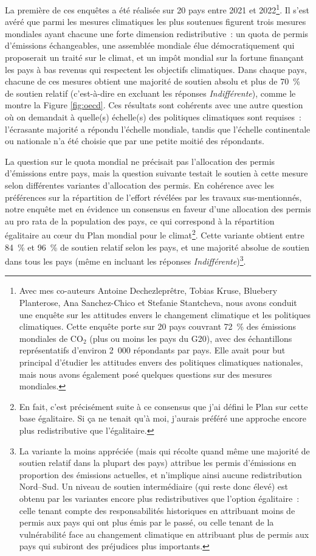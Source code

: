 \documentclass[a5paper,french]{memoir}
\begin{document}
La première de ces enquêtes a été réalisée sur 20 pays %
entre 2021 et 2022\footnote{Avec mes co-auteurs Antoine Dechezleprêtre, Tobias Kruse, Bluebery Planterose, Ana Sanchez-Chico et Stefanie Stantcheva, nous avons conduit une enquête sur les attitudes envers le changement climatique et les politiques climatiques. Cette enquête porte sur 20 pays couvrant 72~\% des émissions mondiales de CO$_\text{2}$ (plus ou moins les pays du G20), avec des échantillons représentatifs d'environ 2~000 répondants par pays. Elle avait pour but principal d'étudier les attitudes envers des politiques climatiques nationales, mais nous avons également posé quelques questions sur des mesures mondiales.}. Il s'est avéré que parmi les mesures climatiques les plus soutenues figurent trois mesures mondiales ayant chacune une forte dimension redistributive~: un quota de permis d'émissions échangeables, une assemblée mondiale élue démocratiquement qui proposerait un traité sur le climat, et un impôt mondial sur la fortune finançant les pays à bas revenus qui respectent les objectifs climatiques. Dans chaque pays, chacune de ces mesures obtient une majorité de soutien absolu %
et plus de 70~\% de soutien relatif (c'est-à-dire en excluant les réponses \textit{Indifférent\textperiodcentered{}e}), 
comme le montre la Figure \ref{fig:oecd}. Ces résultats sont cohérents avec une autre question où on demandait à quelle(s) échelle(s) des politiques climatiques sont requises~: %
l'écrasante majorité a répondu l'échelle mondiale, tandis que l'échelle continentale ou nationale n'a été choisie que par une petite moitié des répondants. 

La question sur le quota mondial ne précisait pas l'allocation des permis d'émissions entre pays, mais la question suivante testait le soutien à cette mesure selon différentes variantes d'allocation des permis. En cohérence avec les préférences sur la répartition de l'effort révélées par les travaux sus-mentionnés, notre enquête met en évidence un consensus en faveur d'une allocation des permis au pro rata de la population des pays, ce qui correspond à la répartition égalitaire au cœur du Plan mondial pour le climat\footnote{En fait, c'est précisément suite à ce consensus que j'ai défini le Plan sur cette base égalitaire. Si ça ne tenait qu'à moi, j'aurais préféré une approche encore plus redistributive que l'égalitaire.}. Cette variante obtient entre 84~\% et 96~\% de soutien relatif selon les pays, et une majorité absolue de soutien dans tous les pays (même en incluant les réponses \textit{Indifférent\textperiodcentered{}e})\footnote{La variante la moins appréciée (mais qui récolte quand même une majorité de soutien relatif dans la plupart des pays) attribue les permis d'émissions en proportion des émissions actuelles, et n'implique ainsi aucune redistribution Nord--Sud. Un niveau de soutien intermédiaire (qui reste donc élevé) est obtenu par les variantes encore plus redistributives que l'option égalitaire~: celle tenant compte des responsabilités historiques en attribuant moins de permis aux pays qui ont plus émis par le passé, ou celle tenant de la vulnérabilité face au changement climatique en attribuant plus de permis aux pays qui subiront des préjudices plus importants.}.
\end{document}
